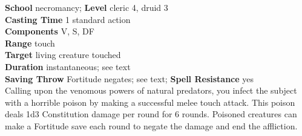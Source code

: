 \textbf{School} necromancy; \textbf{Level} cleric 4, druid 3\\
\textbf{Casting Time} 1 standard action\\
\textbf{Components} V, S, DF\\
\textbf{Range} touch\\
\textbf{Target} living creature touched\\
\textbf{Duration} instantaneous; see text\\
\textbf{Saving Throw} Fortitude negates; see text; \textbf{Spell Resistance} yes\\
Calling upon the venomous powers of natural predators, you infect the subject with a horrible poison by making a successful melee touch attack. This poison deals 1d3 Constitution damage per round for 6 rounds. Poisoned creatures can make a Fortitude save each round to negate the damage and end the affliction.\\

